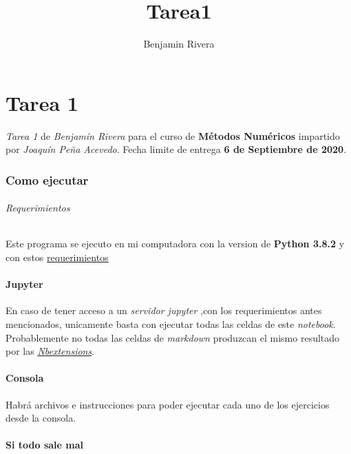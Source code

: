 \documentclass[11pt]{article}
\title{Tarea1}
\author{Benjamin Rivera}
\begin{document}
    
    \maketitle
    \tableofcontents    

    
    \hypertarget{tarea-1}{%
\part*{Tarea 1}\label{tarea-1}}

\emph{Tarea 1} de \emph{Benjamín Rivera} para el curso de
\textbf{Métodos Numéricos} impartido por \emph{Joaquín Peña Acevedo}.
Fecha limite de entrega \textbf{6 de Septiembre de 2020}.

\newpage
    \hypertarget{como-ejecutar}{%
\section*{Como ejecutar}\label{como-ejecutar}}

    \hypertarget{requerimientos}{%
\paragraph{Requerimientos}\label{requerimientos}}

Este programa se ejecuto en mi computadora con la version de
\textbf{Python 3.8.2} y con estos
\href{https://github.com/BenchHPZ/UG-Compu/blob/master/MN/requerimientos.txt}{requerimientos}

\hypertarget{jupyter}{%
\subsection*{Jupyter}\label{jupyter}}

En caso de tener acceso a un \emph{servidor jupyter} ,con los
requerimientos antes mencionados, unicamente basta con ejecutar todas
las celdas de este \emph{notebook}. Probablemente no todas las celdas de
\emph{markdown} produzcan el mismo resultado por las
\href{jupyter-contrib-nbextensions.readthedocs.io}{\emph{Nbextensions}}.

\hypertarget{consola}{%
\subsection*{Consola}\label{consola}}

Habrá archivos e instrucciones para poder ejecutar cada uno de los
ejercicios desde la consola.

\hypertarget{si-todo-sale-mal}{%
\subsection*{Si todo sale mal}\label{si-todo-sale-mal}}
\end{document}
